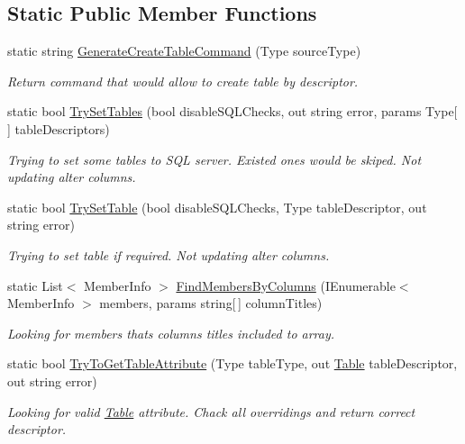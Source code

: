 \subsection*{Static Public Member Functions}
\begin{DoxyCompactItemize}
\item 
static string \mbox{\hyperlink{class_uniform_data_operator_1_1_sql_1_1_attributes_1_1_table_a4a18e92f3ee33003a7da468a9d5ab696}{Generate\+Create\+Table\+Command}} (Type source\+Type)
\begin{DoxyCompactList}\small\item\em Return command that would allow to create table by descriptor. \end{DoxyCompactList}\item 
static bool \mbox{\hyperlink{class_uniform_data_operator_1_1_sql_1_1_attributes_1_1_table_a0b905b5fd9ab2e381ce6cf81c3324a22}{Try\+Set\+Tables}} (bool disable\+S\+Q\+L\+Checks, out string error, params Type\mbox{[}$\,$\mbox{]} table\+Descriptors)
\begin{DoxyCompactList}\small\item\em Trying to set some tables to S\+QL server. Existed ones would be skiped. Not updating alter columns. \end{DoxyCompactList}\item 
static bool \mbox{\hyperlink{class_uniform_data_operator_1_1_sql_1_1_attributes_1_1_table_a80d799a2ba3419b489b9840f624880ff}{Try\+Set\+Table}} (bool disable\+S\+Q\+L\+Checks, Type table\+Descriptor, out string error)
\begin{DoxyCompactList}\small\item\em Trying to set table if required. Not updating alter columns. \end{DoxyCompactList}\item 
static List$<$ Member\+Info $>$ \mbox{\hyperlink{class_uniform_data_operator_1_1_sql_1_1_attributes_1_1_table_a7808fc23fc487fc878bd8d7869304ed1}{Find\+Members\+By\+Columns}} (I\+Enumerable$<$ Member\+Info $>$ members, params string\mbox{[}$\,$\mbox{]} column\+Titles)
\begin{DoxyCompactList}\small\item\em Looking for members that\textquotesingle{}s column\textquotesingle{}s titles included to array. \end{DoxyCompactList}\item 
static bool \mbox{\hyperlink{class_uniform_data_operator_1_1_sql_1_1_attributes_1_1_table_a8de48462eb10c4eddc660a2f19e96d0e}{Try\+To\+Get\+Table\+Attribute}} (Type table\+Type, out \mbox{\hyperlink{class_uniform_data_operator_1_1_sql_1_1_attributes_1_1_table}{Table}} table\+Descriptor, out string error)
\begin{DoxyCompactList}\small\item\em Looking for valid \mbox{\hyperlink{class_uniform_data_operator_1_1_sql_1_1_attributes_1_1_table}{Table}} attribute. Chack all overridings and return correct descriptor. \end{DoxyCompactList}\end{DoxyCompactItemize}
